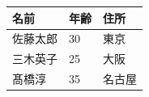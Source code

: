 \documentclass[11pt,a4paper]{article}
\begin{document}
\begin{table}[h]
\begin{tabular}{|l|l|l|}
\hline
名前 & 年齢 & 住所 \\ \hline
佐藤太郎 & 30 & 東京 \\ \hline
三木英子 & 25 & 大阪 \\ \hline
髙橋淳 & 35 & 名古屋 \\ \hline
\end{tabular}
\end{table}
\end{document}

